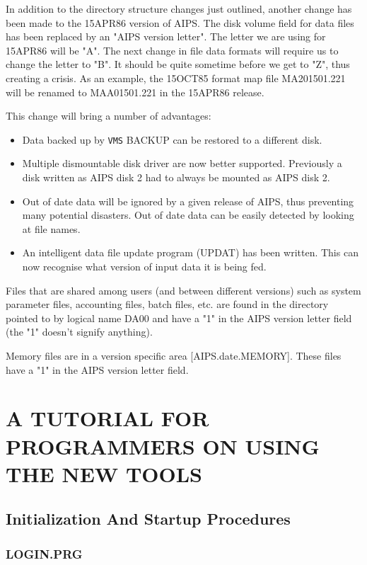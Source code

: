 In addition to the directory structure changes just outlined, another
change has been made to the 15APR86 version of AIPS.
The disk volume field for data files has been replaced by an "AIPS
version letter".  The letter we are using for 15APR86 will be "A".
The next change in file data formats will require us to change the
letter to "B".  It should be quite sometime before we get to "Z", thus
creating a crisis.  As an example, the 15OCT85 format map file
MA201501.221 will be renamed to MAA01501.221 in the 15APR86 release.

This change will bring a number of advantages:

\begin{itemize}
  \item{Data backed up by {\tt VMS\/} BACKUP can be restored to a
	different disk. }
  \item{Multiple dismountable disk driver are now better supported.
	Previously a disk written as AIPS disk 2 had to always be mounted as
	AIPS disk 2.}
  \item{Out of date data will be ignored by a given release of AIPS,
	thus preventing many potential disasters.  Out of date data can
	be easily detected by looking at file names.}
  \item{An intelligent data file update program (UPDAT) has been
	written.  This can now recognise what version of input data it
	is being fed. }
\end{itemize}

Files that are shared among users (and between different versions) such
as system parameter files, accounting files, batch files, etc. are
found in the directory pointed to by logical name DA00 and have a "1"
in the AIPS version letter field (the "1" doesn't signify anything).

Memory files are in a version specific area [AIPS.date.MEMORY].  These
files have a "1" in the AIPS version letter field.

\section{ A TUTORIAL FOR PROGRAMMERS ON USING THE NEW TOOLS }
\subsection{ Initialization And Startup Procedures }
\subsubsection{ LOGIN.PRG }

